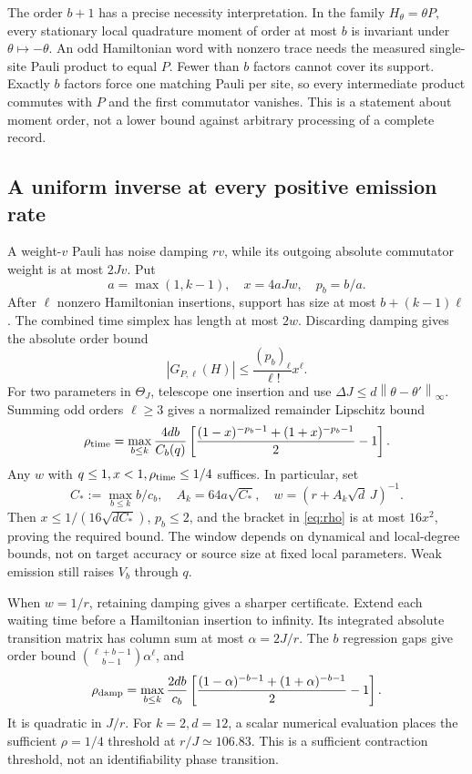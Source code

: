 \documentclass[11pt]{article}
\newcommand{\norm}[1]{\left\lVert #1\right\rVert}
\begin{document}
The order \(b+1\) has a precise necessity interpretation. In the family \(H_\theta=\theta P\), every stationary local quadrature moment of order at most \(b\) is invariant under \(\theta\mapsto-\theta\). An odd Hamiltonian word with nonzero trace needs the measured single-site Pauli product to equal \(P\). Fewer than \(b\) factors cannot cover its support. Exactly \(b\) factors force one matching Pauli per site, so every intermediate product commutes with \(P\) and the first commutator vanishes. This is a statement about moment order, not a lower bound against arbitrary processing of a complete record.

\subsection{A uniform inverse at every positive emission rate}
A weight-\(v\) Pauli has noise damping \(rv\), while its outgoing absolute commutator weight is at most \(2Jv\). Put
\[
 a=\max(1,k-1),\quad x=4aJw,\quad p_b=b/a.
\]
After \(\ell\) nonzero Hamiltonian insertions, support has size at most \(b+(k-1)\ell\). The combined time simplex has length at most \(2w\). Discarding damping gives the absolute order bound
\[
 |G_{P,\ell}(H)|\le\frac{(p_b)_\ell}{\ell!}x^\ell.
\]
For two parameters in \(\Theta_J\), telescope one insertion and use
\(\Delta J\le d\norm{\theta-\theta'}_\infty\). Summing odd orders \(\ell\ge3\) gives a normalized remainder Lipschitz bound
\begin{equation}
 \rho_{\rm time}=\max_{b\le k}\frac{4db}{C_b(q)}
 \left[\frac{(1-x)^{-p_b-1}+(1+x)^{-p_b-1}}2-1\right].
 \label{eq:rho}
\end{equation}
Any \(w\) with \(q\le1,x<1,\rho_{\rm time}\le1/4\) suffices. In particular, set
\[
 C_*:=\max_{b\le k}b/c_b,\quad
 A_k=64a\sqrt{C_*},\quad
 w=(r+A_k\sqrt d\,J)^{-1}.
\]
Then \(x\le1/(16\sqrt{dC_*})\), \(p_b\le2\), and the bracket in \eqref{eq:rho} is at most \(16x^2\), proving the required bound. The window depends on dynamical and local-degree bounds, not on target accuracy or source size at fixed local parameters. Weak emission still raises \(V_b\) through \(q\).

When \(w=1/r\), retaining damping gives a sharper certificate. Extend each waiting time before a Hamiltonian insertion to infinity. Its integrated absolute transition matrix has column sum at most \(\alpha=2J/r\). The \(b\) regression gaps give order bound \({\ell+b-1\choose b-1}\alpha^\ell\), and
\[
 \rho_{\rm damp}=\max_{b\le k}\frac{2db}{c_b}
 \left[\frac{(1-\alpha)^{-b-1}+(1+\alpha)^{-b-1}}2-1\right].
\]
It is quadratic in \(J/r\). For \(k=2,d=12\), a scalar numerical evaluation places the sufficient \(\rho=1/4\) threshold at \(r/J\simeq106.83\). This is a sufficient contraction threshold, not an identifiability phase transition.
\end{document}
